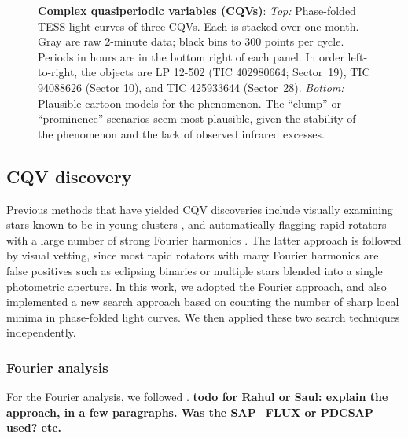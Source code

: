 \documentclass[11pt,twocolumn,tighten]{aastex63}
\begin{document}
\begin{figure*}[!t]
	\begin{center}
		
		\vspace{-0.15cm}
	\end{center}
	\caption{
		{\bf Complex quasiperiodic variables (CQVs)}:
		{\it Top:} Phase-folded TESS light curves of three CQVs.  Each is
		stacked over one month.  Gray are raw 2-minute data; black bins to
		300 points per cycle.  Periods in hours are in the bottom right of
		each panel.  In order left-to-right, the objects are LP 12-502
		(TIC 402980664; Sector~19), TIC 94088626 (Sector 10), and TIC
		425933644 (Sector~28).
		{\it Bottom:} Plausible cartoon models for the phenomenon.
		The ``clump'' or ``prominence'' scenarios seem most plausible,
		given the stability of the phenomenon and the lack of observed infrared excesses.
	}
	\label{fig:f1}
\end{figure*}


\subsection{CQV discovery}
\label{subsec:discoverymethods}

Previous methods that have yielded CQV discoveries include visually
examining stars known to be in young clusters
\citep{2017AJ....153..152S}, and automatically flagging rapid rotators
with a large number of strong Fourier harmonics
\citep{2019ApJ...876..127Z}.  The latter approach is followed by
visual vetting, since most rapid rotators with many Fourier harmonics
are false positives such as eclipsing binaries or multiple stars
blended into a single photometric aperture.  In this work, we adopted
the Fourier approach, and also implemented a new search approach based
on counting the number of sharp local minima in phase-folded light
curves.  We then applied these two search techniques independently.   


\subsubsection{Fourier analysis}
\label{subsec:fourier}
For the Fourier analysis, we followed
\citet{2019ApJ...876..127Z}.
{\bf todo for Rahul or Saul: explain the approach, in a few
paragraphs.  Was the SAP\_FLUX or PDCSAP used? etc. }
\end{document}
